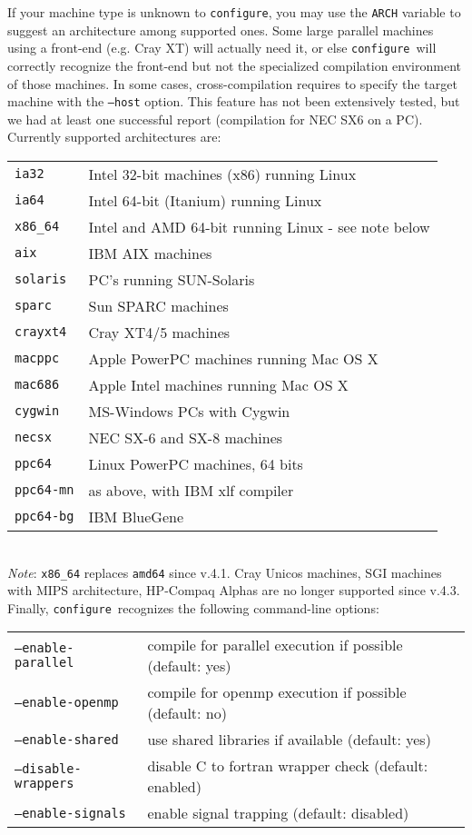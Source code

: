 \documentclass[12pt,a4paper]{article}
\def\version{4.3}
\def\configure{\texttt{configure}}
\begin{document}
If your machine type is unknown to \configure, you may use the 
\texttt{ARCH}
variable to suggest an architecture among supported ones. Some large
parallel machines using a front-end (e.g. Cray XT) will actually
need it, or else \configure\ will correctly recognize the front-end
but not the specialized compilation environment of those
machines. In some cases, cross-compilation requires to specify the target machine with the
\texttt{--host} option. This feature has not been extensively
tested, but we had at least one successful report (compilation 
for NEC SX6 on a PC). Currently supported architectures are:\\
\begin{tabular}{ll}
\texttt{ia32}&    Intel 32-bit machines (x86) running Linux\\
\texttt{ia64}&    Intel 64-bit (Itanium) running Linux\\
\texttt{x86\_64}&  Intel and AMD 64-bit running Linux - see note below\\
\texttt{aix}&     IBM AIX machines\\
\texttt{solaris}& PC's running SUN-Solaris\\
\texttt{sparc}&   Sun SPARC machines\\
\texttt{crayxt4}& Cray XT4/5 machines\\
\texttt{macppc}&  Apple PowerPC machines running Mac OS X\\
\texttt{mac686}&  Apple Intel machines running Mac OS X\\
\texttt{cygwin}&  MS-Windows PCs with Cygwin\\
\texttt{necsx}&   NEC SX-6 and SX-8 machines\\
\texttt{ppc64}&   Linux PowerPC machines, 64 bits\\
\texttt{ppc64-mn}&as above, with IBM xlf compiler\\
\texttt{ppc64-bg}&IBM BlueGene
\end{tabular}\\
{\em Note}: \texttt{x86\_64} replaces \texttt{amd64} since v.4.1. 
Cray Unicos machines, SGI 
machines with MIPS architecture, HP-Compaq Alphas are no longer supported
since v.\version.
Finally, \configure\ recognizes the following command-line options:\\
\begin{tabular}{ll}
\texttt{--enable-parallel}&     compile for parallel execution if possible (default: yes)\\
\texttt{--enable-openmp}&       compile for openmp execution if possible (default: no)\\
\texttt{--enable-shared}&       use shared libraries if available (default: yes)\\
\texttt{--disable-wrappers}&    disable C to fortran wrapper check (default: enabled)\\
\texttt{--enable-signals}&      enable signal trapping (default: disabled)\\
\end{tabular}\\
\end{document}
